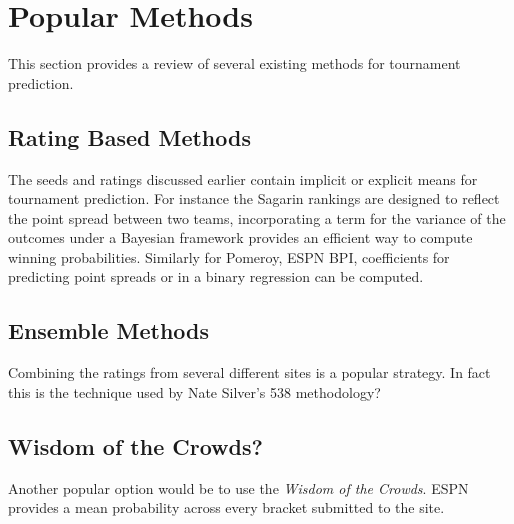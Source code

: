 \section{Popular Methods}  This section provides a review of several existing methods for tournament prediction.
\subsection{Rating Based Methods} 
The seeds and ratings discussed earlier contain implicit or explicit means for tournament prediction.  For instance the Sagarin rankings are designed to reflect the point spread between two teams, incorporating a term for the variance of the outcomes under a Bayesian framework provides an efficient way to compute winning probabilities.  Similarly for Pomeroy, ESPN BPI, coefficients for predicting point spreads or in a binary regression can be computed.
\subsection{Ensemble Methods}
Combining the ratings from several different sites is a popular strategy.  In fact this is the technique used by Nate Silver's 538 methodology?
\subsection{Wisdom of the Crowds?}
Another popular option would be to use the \emph{Wisdom of the Crowds}.  ESPN provides a mean probability across every bracket submitted to the site.

